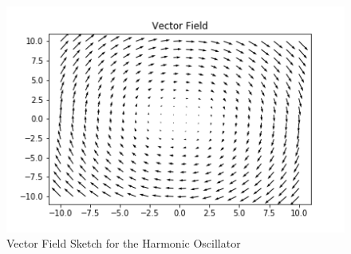 \documentclass[12pt]{exam}
\begin{document}
\begin{questions}
  \begin{figure}[htbp]
    \centering
    \includegraphics{vector_field_example.png}
    \caption{Vector Field Sketch for the Harmonic Oscillator}
    \label{fig:vector_field_sketch}
  \end{figure}


\end{questions}
\end{document}
